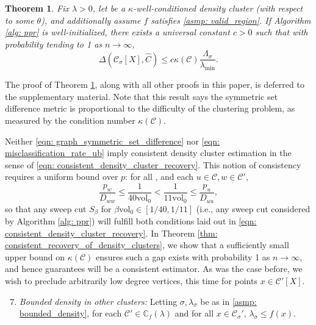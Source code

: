 \documentclass{article}
\newcommand{\vol}{\mathrm{vol}}
\newcommand{\1}{\mathbf{1}}
\newcommand{\pbf}{p}        %
\newcommand{\Xbf}{X}             %
\newcommand{\Dbf}{D}
\newcommand{\Cbb}{\mathbb{C}}
\newcommand{\Cset}{\mathcal{C}}
\newcommand{\Csig}{\Cset_{\sigma}}
\newcommand{\Cest}{\widehat{C}}
\theoremstyle{aldenthm}
\newtheorem{theorem}{Theorem}
\theoremstyle{aldenrmrk}
\begin{document}
\begin{theorem}
  \label{thm: misclassification_rate}
  Fix $\lambda > 0$, let \smash{$\Cset \in \Cbb_f(\lambda)$} be a
  $\kappa$-well-conditioned density cluster (with respect to some $\theta$), and
  additionally assume $f$ satisfies \ref{asmp: valid_region}. If Algorithm
  \ref{alg: ppr} is well-initialized, there exists a universal constant $c >
  0$ such that with probability tending to 1 as $n \to \infty$,  
  \begin{equation}
    \label{eqn: misclassification_rate_ub}
    \Delta(\Csig[\Xbf], \Cest) \leq c \kappa(\Cset)
    \frac{\Lambda_{\sigma}}{\lambda_{\min}}. 
  \end{equation}
\end{theorem}

The proof of Theorem \ref{thm: misclassification_rate}, along with all other
proofs in this paper, is deferred to the supplementary material. Note that this 
result says the symmetric set difference metric \smash{$\Delta(\Csig[\Xbf],
  \Cest)$} is proportional to the difficulty of the clustering problem, as
measured by the condition number $\kappa(\Cset)$. 

Neither \eqref{eqn: graph_symmetric_set_difference} nor \eqref{eqn:
  misclassification_rate_ub} imply consistent density cluster estimation in the 
sense of \eqref{eqn: consistent_density_cluster_recovery}. This notion of
consistency requires a uniform bound over $\pbf$: for all \smash{$\Cset'
  \in \Cbb_f(\lambda), \Cset' \neq \Cset$}, and each $u \in \Cset, w \in
\Cset'$,  
\begin{equation}
\label{eqn: ppr_gap}
\frac{p_{w}}{\Dbf_{ww}} \leq \frac{1}{40\vol_0} < \frac{1}{11\vol_0} \leq
\frac{p_u}{\Dbf_{uu}}, 
\end{equation}
so that any sweep cut $S_{\beta}$ for $\beta \vol_0 \in [1/40,1/11]$ (i.e., any
sweep cut considered by Algorithm \ref{alg: ppr}) will fulfill both conditions
laid out in \eqref{eqn: consistent_density_cluster_recovery}. In Theorem
\ref{thm: consistent_recovery_of_density_clusters}, we show that a sufficiently
small upper bound on $\kappa(\Cset)$ ensures such a gap exists with probability
1 as $n \to \infty$, and hence guarantees \smash{$\Cest$} will be a consistent  
estimator. As was the case before, we wish to preclude arbitrarily low degree
vertices, this time for points $x \in \Cset'[\Xbf]$. 
\begin{enumerate}[label=(A\arabic*)]
  \setcounter{enumi}{6}
\item 
  \label{asmp: C'_bounded_density}
  \emph{Bounded density in other clusters:} Letting $\sigma,\lambda_{\sigma}$ be 
  as in \ref{asmp: bounded_density}, for each $\Cset' \in \Cbb_f(\lambda)$ and
  for all $x \in \Csig'$, $\lambda_{\sigma} \leq f(x)$. 
\end{enumerate}
\end{document}
